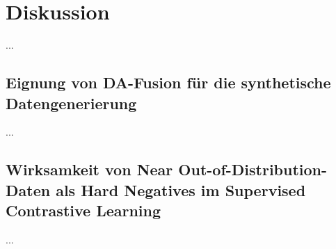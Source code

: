 \chapter{Diskussion}

...

\section{Eignung von DA-Fusion für die synthetische Datengenerierung}

...

\section{Wirksamkeit von Near Out-of-Distribution-Daten als Hard Negatives im Supervised Contrastive Learning}

...